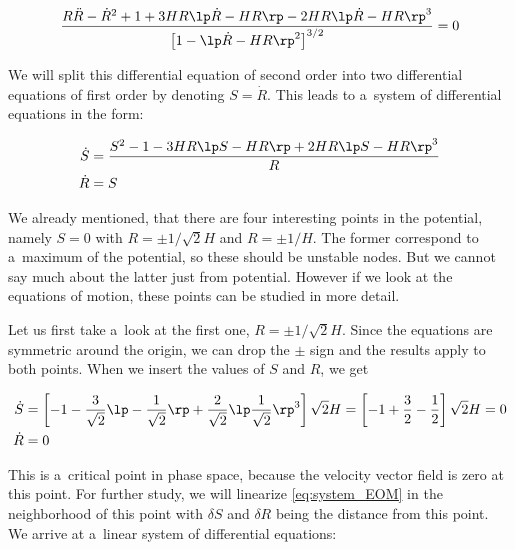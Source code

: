 \begin{equation}
\label{eq:desiter_diff_eq}
    \frac{R \ddot{R} - \dot{R}^2 + 1 + 3HR \lp \dot{R} - HR \rp - 2HR \lp \dot{R} - HR \rp^3 }{\left[ 1 - \lp \dot{R} - HR \rp^2 \right]^{3/2}} = 0
\end{equation}

\noindent
We will split this differential equation of second order into two differential equations of first order by denoting $S = \dot{R}$. This leads to a~system of differential equations in the form:

\begin{equation}
\label{eq:system_EOM}
\begin{aligned}
        \dot{S} & = \frac{S^2 - 1 - 3HR \lp S - HR \rp + 2HR \lp S-HR \rp^3 }{R} \\
        \dot{R} & = S 
    \end{aligned}
\end{equation}

\noindent
We already mentioned, that there are four interesting points in the potential, namely $S = 0$ with $R = \pm  1/\sqrt{2}H$ and $R = \pm 1/H$. The former correspond to a~maximum of the potential, so these should be unstable nodes. But we cannot say much about the latter just from potential. However if we look at the equations of motion, these points can be studied in more detail. 

Let us first take a~look at the first one, $R = \pm 1/\sqrt{2}H$. Since the equations are symmetric around the origin, we can drop the $\pm$ sign and the results apply to both points. When we insert the values of $S$ and $R$, we get

\begin{equation}
     \begin{aligned}
        \dot{S} &= \left[ -1 - \frac{3}{\sqrt{2}} \lp -\frac{1}{\sqrt{2}} \rp + \frac{2}{\sqrt{2}} \lp \frac{1}{\sqrt{2}} \rp ^3  \right] \sqrt{2} H = \left[ -1 + \frac{3}{2} - \frac{1}{2} \right] \sqrt{2} H = 0 \\
        \dot{R} &= 0
     \end{aligned}
\end{equation}

\noindent
This is a~critical point in phase space, because the velocity vector field is zero at this point. For further study, we will linearize \cref{eq:system_EOM} in the neighborhood of this point with $\delta S$ and $\delta R$ being the distance from this point. We arrive at a~linear system of differential equations:

